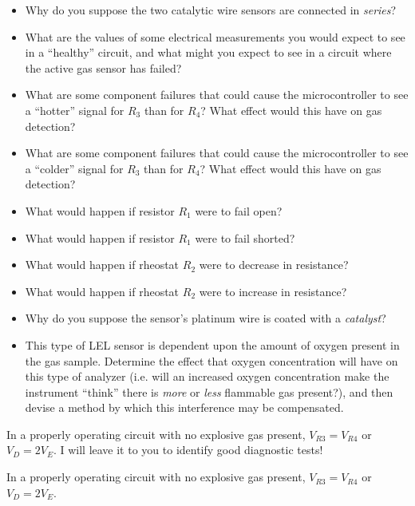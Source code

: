 \begin{itemize}
\item{} Why do you suppose the two catalytic wire sensors are connected in {\it series}?
\item{} What are the values of some electrical measurements you would expect to see in a ``healthy'' circuit, and what might you expect to see in a circuit where the active gas sensor has failed?  
\item{} What are some component failures that could cause the microcontroller to see a ``hotter'' signal for $R_3$ than for $R_4$?  What effect would this have on gas detection?
\item{} What are some component failures that could cause the microcontroller to see a ``colder'' signal for $R_3$ than for $R_4$?  What effect would this have on gas detection?
\item{} What would happen if resistor $R_1$ were to fail open?
\item{} What would happen if resistor $R_1$ were to fail shorted?
\item{} What would happen if rheostat $R_2$ were to decrease in resistance?
\item{} What would happen if rheostat $R_2$ were to increase in resistance?
\item{} Why do you suppose the sensor's platinum wire is coated with a {\it catalyst}?
\item{} This type of LEL sensor is dependent upon the amount of oxygen present in the gas sample.  Determine the effect that oxygen concentration will have on this type of analyzer (i.e. will an increased oxygen concentration make the instrument ``think'' there is {\it more} or {\it less} flammable gas present?), and then devise a method by which this interference may be compensated.
\end{itemize}







In a properly operating circuit with no explosive gas present, $V_{R3} = V_{R4}$ or $V_D = 2 V_E$.  I will leave it to you to identify good diagnostic tests!







In a properly operating circuit with no explosive gas present, $V_{R3} = V_{R4}$ or $V_D = 2 V_E$.  


